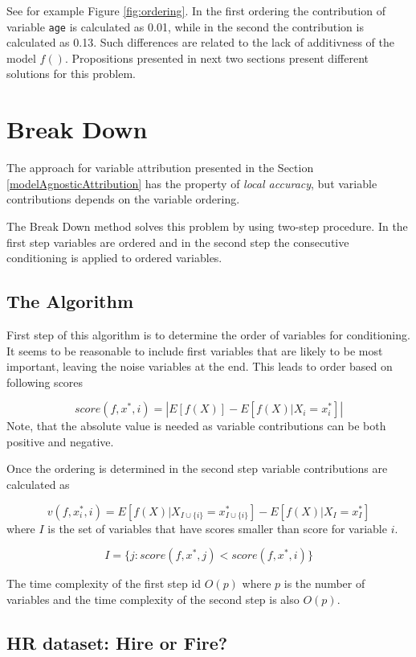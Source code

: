 \documentclass[]{book}
\theoremstyle{definition}
\theoremstyle{definition}
\theoremstyle{definition}
\theoremstyle{remark}
\begin{document}
See for example Figure \ref{fig:ordering}. In the first ordering the
contribution of variable \texttt{age} is calculated as 0.01, while in
the second the contribution is calculated as 0.13. Such differences are
related to the lack of additivness of the model \(f()\). Propositions
presented in next two sections present different solutions for this
problem.

\hypertarget{breakDown}{%
\chapter{Break Down}\label{breakDown}}

The approach for variable attribution presented in the Section
\ref{modelAgnosticAttribution} has the property of \emph{local
accuracy}, but variable contributions depends on the variable ordering.

The Break Down method solves this problem by using two-step procedure.
In the first step variables are ordered and in the second step the
consecutive conditioning is applied to ordered variables.

\hypertarget{the-algorithm}{%
\section{The Algorithm}\label{the-algorithm}}

First step of this algorithm is to determine the order of variables for
conditioning. It seems to be reasonable to include first variables that
are likely to be most important, leaving the noise variables at the end.
This leads to order based on following scores

\[
score(f, x^*, i) = \left| E [f(X)] - E [f(X)|X_i = x^*_i] \right|
\] Note, that the absolute value is needed as variable contributions can
be both positive and negative.

Once the ordering is determined in the second step variable
contributions are calculated as

\[
v(f, x^*_i, i) = E [f(X) | X_{I \cup \{i\}} = x_{I \cup \{i\}}^*] - E [f(X) | X_{I} = x_{I}^*] 
\] where \(I\) is the set of variables that have scores smaller than
score for variable \(i\).

\[
I = \{j: score(f, x^*, j) < score(f, x^*, i)\}
\]

The time complexity of the first step id \(O(p)\) where \(p\) is the
number of variables and the time complexity of the second step is also
\(O(p)\).

\hypertarget{hr-dataset-hire-or-fire}{%
\section{HR dataset: Hire or Fire?}\label{hr-dataset-hire-or-fire}}
\end{document}
